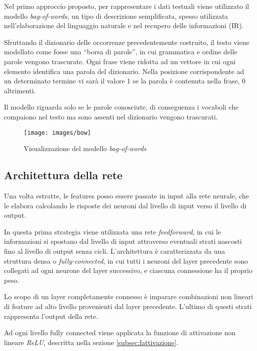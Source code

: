 Nel primo approccio proposto, per rappresentare i dati testuali viene utilizzato il modello \emph{bag-of-words}, un tipo di descrizione semplificata, spesso utilizzata nell'elaborazione del linguaggio naturale e nel recupero delle informazioni (IR). 

Sfruttando il dizionario delle occorrenze precedentemente costruito, il testo viene modellato  come fosse una ``borsa di parole'', in cui grammatica e ordine delle parole vengono trascurate.
Ogni frase viene ridotta ad un vettore in cui ogni elemento identifica una parola del dizionario. Nella posizione corrispondente ad un determinato termine vi sarà il valore \num{1} se la parola è contenuta nella frase, \num{0} altrimenti.

Il modello riguarda solo se le parole conosciute, di conseguenza i vocaboli che compaiono nel testo ma sono assenti nel dizionario vengono trascurati.

\begin{figure}[H]
	\centering
	{\texttt{[image: images/bow]}}
	\caption{Visualizzazione del modello \emph{bag-of-words}}
	\label{fig:bow}
\end{figure}


\subsection{Architettura della rete}
\label{subsec:modelli}

Una volta estratte, le features posso essere passate in input alla rete neurale, che le elabora calcolando le risposte dei neuroni dal livello di input verso il livello di output.

In questa prima strategia viene utilizzata una rete \emph{feedforward}, in cui le informazioni si spostano dal livello di input attraverso eventuali strati nascosti fino al livello di output senza cicli. L'architettura è caratterizzata da una struttura densa o \emph{fully-connected}, in cui tutti i neuroni del layer precedente sono collegati ad ogni neurone del layer successivo, e ciascuna connessione ha il proprio peso.


Lo scopo di un layer completamente connesso è imparare combinazioni non lineari di feature ad alto livello provenienti dal layer precedente. L'ultimo di questi strati rappresenta l’output della rete.

Ad ogni livello fully connected viene applicata la funzione di attivazione non lineare \emph{ReLU}, descritta nella sezione \ref{subsec:fattivazione}.

